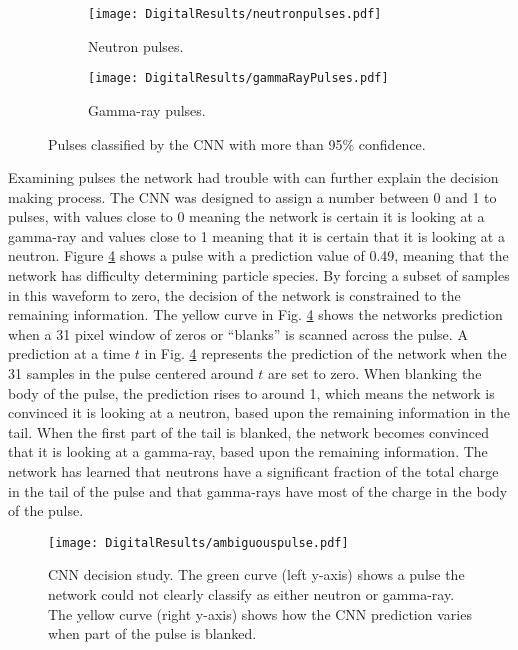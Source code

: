\documentclass[main.tex]{subfiles}
\begin{document}
\begin{figure}[h!]
\centering
\begin{subfigure}{.5\textwidth}
  \centering
  \texttt{[image: DigitalResults/neutronpulses.pdf]}
  \caption{Neutron pulses.}
  \label{fig:CNNneutron}
\end{subfigure}%
\begin{subfigure}{.5\textwidth}
  \centering
  \texttt{[image: DigitalResults/gammaRayPulses.pdf]}
  \caption{Gamma-ray pulses.}
  \label{fig:CNNgamma}
\end{subfigure}
\caption{Pulses classified by the CNN with more than 95\% confidence.}
\label{fig:CNN95}
\end{figure}

Examining pulses the network had trouble with can further explain the decision making process. The CNN was designed to assign a number between 0 and 1 to pulses, with values close to 0 meaning the network is certain it is looking at a gamma-ray and values close to 1 meaning that it is certain that it is looking at a neutron. 
Figure \ref{fig:occl} shows a pulse with a prediction value of 0.49, meaning that the network has difficulty determining particle species. By forcing a subset of samples in this waveform to zero, the decision of the network is constrained to the remaining information. The yellow curve in Fig. \ref{fig:occl} shows the networks prediction when a 31 pixel window of zeros or ``blanks'' is scanned across the pulse. A prediction at a time $t$ in Fig. \ref{fig:occl} represents the prediction of the network when the 31 samples in the pulse centered around $t$ are set to zero. When blanking the body of the pulse, the prediction rises to around 1, which means the network is convinced it is looking at a neutron, based upon the remaining information in the tail. When the first part of the tail is blanked, the network becomes convinced that it is looking at a gamma-ray, based upon the remaining information. The network has learned that neutrons have a significant fraction of the total charge in the tail of the pulse and that gamma-rays have most of the charge in the body of the pulse.



\begin{figure}[ht!]
    \centering
        \texttt{[image: DigitalResults/ambiguouspulse.pdf]}
        \caption[CNN decision study.]{CNN decision study. The green curve (left y-axis) shows a pulse the network could not clearly classify as either neutron or gamma-ray. The yellow curve (right y-axis) shows how the CNN prediction varies when part of the pulse is blanked.}
    \label{fig:occl} 
\end{figure}
\end{document}

